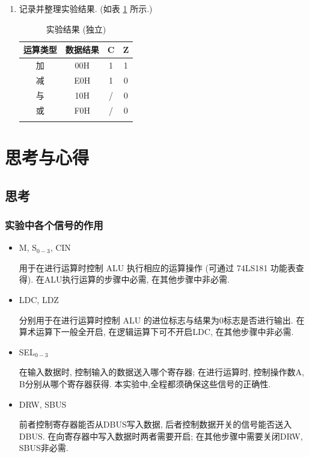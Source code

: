 \documentclass[../main.tex]{subfiles}
\begin{document}
\begin{enumerate}
    \item 记录并整理实验结果. (如表 \ref{tab:1.2} 所示.)

          \begin{table}[htb]
              \centering
              \begin{tabular}{cccc}
                  \Xhline{1pt}
                  运算类型 & 数据结果 & C & Z \\ \hline
                  加    & 00H  & 1 & 1 \\
                  减    & E0H  & 1 & 0 \\
                  与    & 10H  & / & 0 \\
                  或    & F0H  & / & 0 \\
                  \Xhline{1pt}
              \end{tabular}
              \caption{实验结果 (独立)}
              \label{tab:1.2}
          \end{table}

\end{enumerate}

\section{思考与心得}

\subsection{思考}

\subsubsection{实验中各个信号的作用}

\begin{itemize}

    \item M, S$_{0 - 3}$, CIN

          用于在进行运算时控制 ALU 执行相应的运算操作 (可通过 74LS181 功能表查得). 在ALU执行运算的步骤中必需, 在其他步骤中非必需.

    \item LDC, LDZ

          分别用于在进行运算时控制 ALU 的进位标志与结果为0标志是否进行输出. 在算术运算下一般全开启, 在逻辑运算下可不开启LDC, 在其他步骤中非必需.

    \item SEL$_{0 - 3}$

          在输入数据时, 控制输入的数据送入哪个寄存器; 在进行运算时, 控制操作数A, B分别从哪个寄存器获得. 本实验中,全程都须确保这些信号的正确性.

    \item DRW, SBUS

          前者控制寄存器能否从DBUS写入数据, 后者控制数据开关的信号能否送入 DBUS. 在向寄存器中写入数据时两者需要开启; 在其他步骤中需要关闭DRW, SBUS非必需.

\end{itemize}
\end{document}
